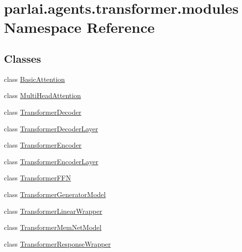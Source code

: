 \hypertarget{namespaceparlai_1_1agents_1_1transformer_1_1modules}{}\section{parlai.\+agents.\+transformer.\+modules Namespace Reference}
\label{namespaceparlai_1_1agents_1_1transformer_1_1modules}
\subsection*{Classes}
\begin{DoxyCompactItemize}
\item 
class \hyperlink{classparlai_1_1agents_1_1transformer_1_1modules_1_1BasicAttention}{Basic\+Attention}
\item 
class \hyperlink{classparlai_1_1agents_1_1transformer_1_1modules_1_1MultiHeadAttention}{Multi\+Head\+Attention}
\item 
class \hyperlink{classparlai_1_1agents_1_1transformer_1_1modules_1_1TransformerDecoder}{Transformer\+Decoder}
\item 
class \hyperlink{classparlai_1_1agents_1_1transformer_1_1modules_1_1TransformerDecoderLayer}{Transformer\+Decoder\+Layer}
\item 
class \hyperlink{classparlai_1_1agents_1_1transformer_1_1modules_1_1TransformerEncoder}{Transformer\+Encoder}
\item 
class \hyperlink{classparlai_1_1agents_1_1transformer_1_1modules_1_1TransformerEncoderLayer}{Transformer\+Encoder\+Layer}
\item 
class \hyperlink{classparlai_1_1agents_1_1transformer_1_1modules_1_1TransformerFFN}{Transformer\+F\+FN}
\item 
class \hyperlink{classparlai_1_1agents_1_1transformer_1_1modules_1_1TransformerGeneratorModel}{Transformer\+Generator\+Model}
\item 
class \hyperlink{classparlai_1_1agents_1_1transformer_1_1modules_1_1TransformerLinearWrapper}{Transformer\+Linear\+Wrapper}
\item 
class \hyperlink{classparlai_1_1agents_1_1transformer_1_1modules_1_1TransformerMemNetModel}{Transformer\+Mem\+Net\+Model}
\item 
class \hyperlink{classparlai_1_1agents_1_1transformer_1_1modules_1_1TransformerResponseWrapper}{Transformer\+Response\+Wrapper}
\end{DoxyCompactItemize}
